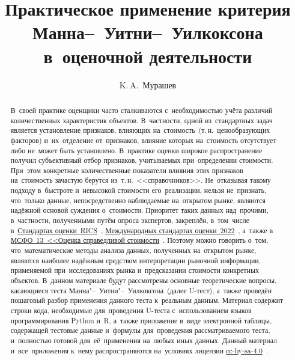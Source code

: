 \documentclass[]{scrartcl}
\title{Практическое применение критерия Манна--~Уитни--~Уилкоксона в~оценочной деятельности}
\author{K.\,A.~{Мурашев}}
\begin{document}
\maketitle
	
\begin{abstract}
	В~своей практике оценщики часто сталкиваются с~необходимостью учёта различий количественных характеристик объектов. В~частности, одной из~стандартных задач является установление признаков, влияющих на~стоимость~(т.\,н.~ценообразующих факторов) и~их~отделение от~признаков, влияние которых на~стоимость отсутствует либо не~может быть установлено. В~практике оценки широкое распространение получил субъективный отбор признаков, учитываемых при~определении стоимости. При~этом конкретные количественные показатели влияния этих признаков на~стоимость зачастую берутся из~т.\,н.~<<справочников>>. Не~отказывая такому подходу в~быстроте и~невысокой стоимости его~реализации, нельзя не~признать, что~только данные, непосредственно наблюдаемые на~открытом рынке, являются надёжной основой суждения о~стоимости. Приоритет таких данных над~прочими, в~частности, полученными путём опроса экспертов, закреплён, в~том~числе в~\href{https://www.rics.org/uk/upholding-professional-standards/sector-standards/valuation/red-book/red-book-global/}{Стандартах оценки~RICS}~\cite{RVGS-2022}, \href{https://www.rics.org/uk/upholding-professional-standards/sector-standards/valuation/red-book/international-valuation-standards/}{Международных стандартах оценки~2022}~\cite{IVS-2022}, а~также в~ \href{https://normativ.kontur.ru/document?moduleId=1&documentId=326168#l0}{МСФО~13~<<Оценка справедливой стоимости}~\cite{MSFO-13}. Поэтому можно говорить о~том, что~математические методы анализа данных, полученных на~открытом рынке, являются наиболее надёжным средством интерпретации рыночной информации, применяемой при~исследованиях рынка и~предсказании стоимости конкретных объектов. В~данном материале будут рассмотрены основные теоретические вопросы, касающиеся теста Манна"--~Уитни"--~Уилкоксона~(далее U-тест), а~также проведён пошаговый разбор применения данного теста к~реальным данным. Материал содержит строки кода, необходимые для~проведения U-теста с~использованием языков программирования Python и~R, а~также приложение в~виде электронной таблицы, содержащей тестовые данные и~формулы для~проведения рассматриваемого теста, и~полностью готовой для~её~применения на~любых иных данных.
	Данный материал и~все~приложения к~нему распространяются на~условиях лицензии \href{https://creativecommons.org/licenses/by-sa/4.0/}{cc-by-sa-4.0}~\cite{cc-by-sa-4.0}.
\end{abstract}
%
\tableofcontents
\listoftables
\listoffigures
\lstlistoflistings
%
\end{document}
